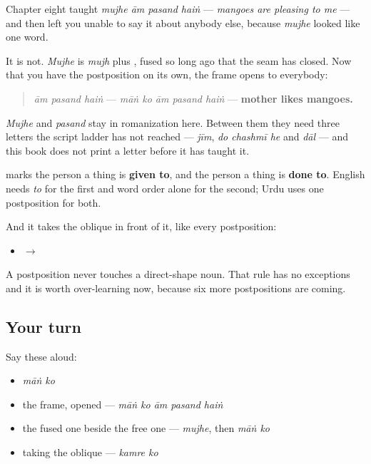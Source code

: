 Chapter eight taught \emph{mujhe ām pasand haiṅ} — \emph{mangoes are pleasing to me} — and then left you unable to say it about anybody else, because \emph{mujhe} looked like one word.

It is not. \emph{Mujhe} is \emph{mujh} plus \textbf{}, fused so long ago that the seam has closed. Now that you have the postposition on its own, the frame opens to everybody:

\begin{quote}
\textbf{ } \emph{ām pasand haiṅ} — \emph{māṅ ko ām pasand haiṅ} — \textbf{mother likes mangoes.}
\end{quote}

\emph{Mujhe} and \emph{pasand} stay in romanization here. Between them they need three letters the script ladder has not reached — \emph{jīm}, \emph{do chashmī he} and \emph{dāl} — and this book does not print a letter before it has taught it.

\begin{grammarlens}[title={Grammar Lens: two jobs, one word}]
\textbf{} marks the person a thing is \textbf{given to}, and the person a thing is \textbf{done to}. English needs \emph{to} for the first and word order alone for the second; Urdu uses one postposition for both.

And it takes the oblique in front of it, like every postposition:

\begin{itemize}
\raggedright
  \item \textbf{} $\to$ \textbf{ }
\end{itemize}

A postposition never touches a direct-shape noun. That rule has no exceptions and it is worth over-learning now, because six more postpositions are coming.
\end{grammarlens}

\subsection*{Your turn}
Say these aloud:

\begin{itemize}
\raggedright
  \item \emph{māṅ ko}
  \item the frame, opened — \emph{māṅ ko ām pasand haiṅ}
  \item the fused one beside the free one — \emph{mujhe}, then \emph{māṅ ko}
  \item taking the oblique — \emph{kamre ko}
\end{itemize}

